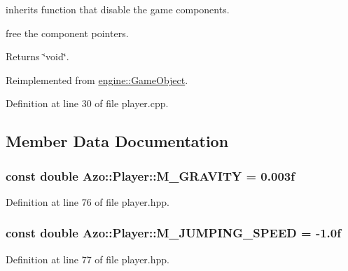 inherits function that disable the game components. 

free the component pointers.

\begin{DoxyReturn}{Returns}
\char`\"{}void\char`\"{}. 
\end{DoxyReturn}


Reimplemented from \hyperlink{classengine_1_1_game_object_a08d7a48b6eb90f55c8b670b6f98ab393}{engine\+::\+Game\+Object}.



Definition at line 30 of file player.\+cpp.



\subsection{Member Data Documentation}
\subsubsection[{\texorpdfstring{M\+\_\+\+G\+R\+A\+V\+I\+TY}{M_GRAVITY}}]{\setlength{\rightskip}{0pt plus 5cm}const double Azo\+::\+Player\+::\+M\+\_\+\+G\+R\+A\+V\+I\+TY = 0.\+003f}\hypertarget{class_azo_1_1_player_a2daa546daa4c5f15640d703fdde56059}{}\label{class_azo_1_1_player_a2daa546daa4c5f15640d703fdde56059}


Definition at line 76 of file player.\+hpp.

\subsubsection[{\texorpdfstring{M\+\_\+\+J\+U\+M\+P\+I\+N\+G\+\_\+\+S\+P\+E\+ED}{M_JUMPING_SPEED}}]{\setlength{\rightskip}{0pt plus 5cm}const double Azo\+::\+Player\+::\+M\+\_\+\+J\+U\+M\+P\+I\+N\+G\+\_\+\+S\+P\+E\+ED = -\/1.\+0f}\hypertarget{class_azo_1_1_player_a926fea900dde401f4b2b5faa28bfa7c6}{}\label{class_azo_1_1_player_a926fea900dde401f4b2b5faa28bfa7c6}


Definition at line 77 of file player.\+hpp.


